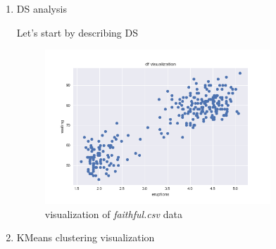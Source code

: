 \documentclass{homework}
\begin{document}
\begin{enumerate}[label=(\alph*)]
	\item DS analysis
		
		Let's start by describing DS

		
		\begin{figure}[H]
			\centering
			\includegraphics[width=0.8\textwidth]{df_visualization.png}
			\caption{visualization of \emph{faithful.csv} data}
		\end{figure}
	\item KMeans clustering visualization


\end{enumerate}
\end{document}
